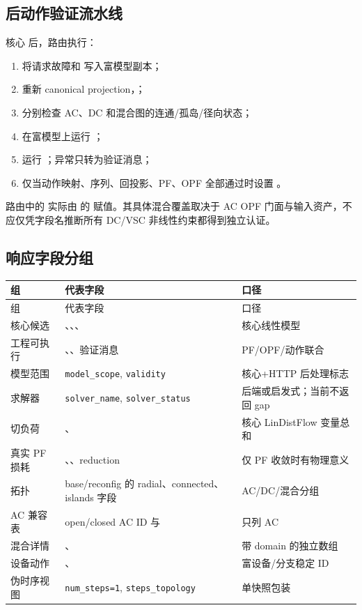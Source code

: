 \subsection{后动作验证流水线}

核心  后，路由执行：
\begin{enumerate}
  \item 将请求故障和  写入富模型副本；
  \item 重新 canonical projection，；
  \item 分别检查 AC、DC 和混合图的连通/孤岛/径向状态；
  \item 在富模型上运行 ；
  \item 运行 ；异常只转为验证消息；
  \item 仅当动作映射、序列、回投影、PF、OPF 全部通过时设置
        。
\end{enumerate}

路由中的  实际由  的
 赋值。其具体混合覆盖取决于 AC OPF 门面与输入资产，不应仅凭字段名推断所有
DC/VSC 非线性约束都得到独立认证。

\subsection{响应字段分组}

\begin{longtable}{@{}L{4.4cm}L{4.2cm}L{6.0cm}@{}}
\toprule
组 & 代表字段 & 口径\\
\midrule
\endfirsthead
\toprule
组 & 代表字段 & 口径\\
\midrule
\endhead
核心候选 & 、、、 & 核心线性模型\\
工程可执行 & 、、验证消息 & PF/OPF/动作联合\\
模型范围 & \texttt{model\_scope}, \texttt{validity} & 核心+HTTP 后处理标志\\
求解器 & \texttt{solver\_name}, \texttt{solver\_status} & 后端或启发式；当前不返回 gap\\
切负荷 & 、 & 核心 LinDistFlow 变量总和\\
真实 PF 损耗 & 、、reduction & 仅 PF 收敛时有物理意义\\
拓扑 & base/reconfig 的 radial、connected、islands 字段 & AC/DC/混合分组\\
AC 兼容表 & open/closed AC ID 与  & 只列 AC\\
混合详情 & 、 & 带 domain 的独立数组\\
设备动作 & 、 & 富设备/分支稳定 ID\\
伪时序视图 & \texttt{num\_steps=1}, \texttt{steps\_topology} & 单快照包装\\
\bottomrule
\end{longtable}

